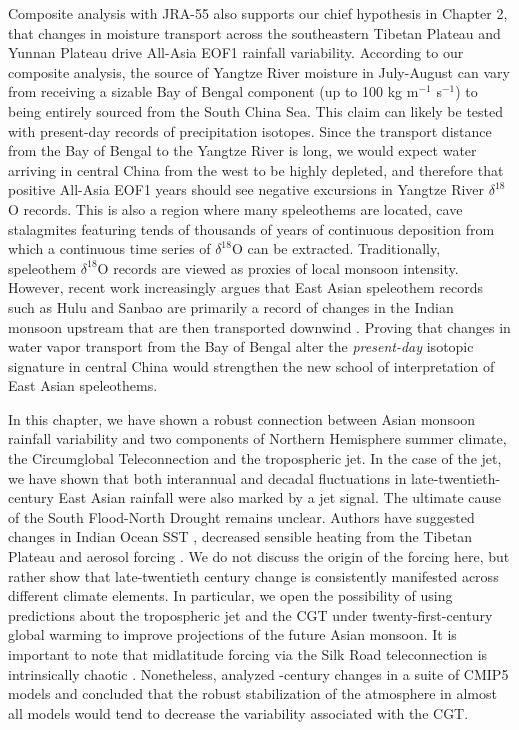 	Composite analysis with JRA-55 also supports our chief hypothesis in Chapter 2, that changes in moisture transport across the southeastern Tibetan Plateau and Yunnan Plateau drive All-Asia EOF1 rainfall variability. According to our composite analysis, the source of Yangtze River moisture in July-August can vary from receiving a sizable Bay of Bengal component (up to 100 kg m$^{-1}$ s$^{-1}$) to being entirely sourced from the South China Sea. This claim can likely be tested with present-day records of precipitation isotopes. Since the transport distance from the Bay of Bengal to the Yangtze River is long, we would expect water arriving in central China from the west to be highly depleted, and therefore that positive All-Asia EOF1 years should see negative excursions in Yangtze River $\delta ^{18}$O records. This is also a region where many speleothems are located, cave stalagmites featuring tends of thousands of years of continuous deposition from which a continuous time series of $\delta ^{18}$O can be extracted. Traditionally, speleothem $\delta ^{18}$O records are viewed as proxies of local monsoon intensity. However, recent work increasingly argues that East Asian speleothem records such as Hulu and Sanbao are primarily a record of changes in the Indian monsoon upstream that are then transported downwind \citep{Pausata2011,Cai2015,Baker2015}. Proving that changes in water vapor transport from the Bay of Bengal alter the \textit{present-day} isotopic signature in central China would strengthen the new school of interpretation of East Asian speleothems.

	 In this chapter, we have shown a robust connection between Asian monsoon rainfall variability and two components of Northern Hemisphere summer climate, the Circumglobal Teleconnection and the tropospheric jet. In the case of the jet, we have shown that both interannual and decadal fluctuations in late-twentieth-century East Asian rainfall were also marked by a jet signal. The ultimate cause of the South Flood-North Drought remains unclear. Authors have suggested changes in Indian Ocean SST \citep{Qu2012}, decreased sensible heating from the Tibetan Plateau \citep{Liu2012a,Hu2015} and aerosol forcing \citep{Song2014}. We do not discuss the origin of the forcing here, but rather show that late-twentieth century change is consistently manifested across different climate elements. In particular, we open the possibility of using predictions about the tropospheric jet and the CGT under twenty-first-century global warming to improve projections of the future Asian monsoon. It is important to note that midlatitude forcing via the Silk Road teleconnection is intrinsically chaotic \citep{Kosaka2012}. Nonetheless, \citet{Lee2014} analyzed -century changes in a suite of CMIP5 models and concluded that the robust stabilization of the atmosphere in almost all models would tend to decrease the variability associated with the CGT. 
	 
